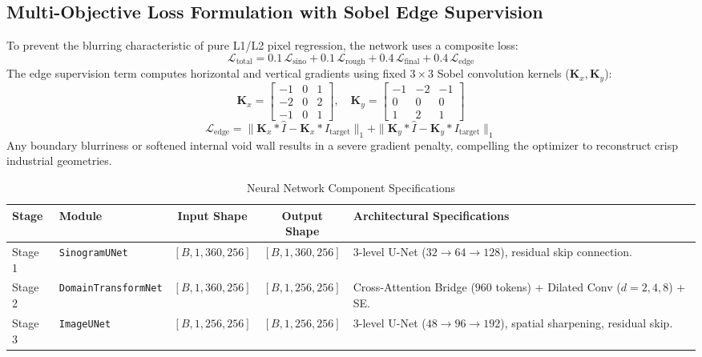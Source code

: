 \documentclass[10pt,a4paper]{article}
\begin{document}
\subsection{Multi-Objective Loss Formulation with Sobel Edge Supervision}
To prevent the blurring characteristic of pure L1/L2 pixel regression, the network uses a composite loss:
\begin{equation}
    \mathcal{L}_{\text{total}} = 0.1\,\mathcal{L}_{\text{sino}} + 0.1\,\mathcal{L}_{\text{rough}} + 0.4\,\mathcal{L}_{\text{final}} + 0.4\,\mathcal{L}_{\text{edge}}
\end{equation}
The edge supervision term computes horizontal and vertical gradients using fixed $3 \times 3$ Sobel convolution kernels ($\mathbf{K}_x, \mathbf{K}_y$):
\begin{equation}
    \mathbf{K}_x = \begin{bmatrix} -1 & 0 & 1 \\ -2 & 0 & 2 \\ -1 & 0 & 1 \end{bmatrix}, \quad
    \mathbf{K}_y = \begin{bmatrix} -1 & -2 & -1 \\ 0 & 0 & 0 \\ 1 & 2 & 1 \end{bmatrix}
\end{equation}
\begin{equation}
    \mathcal{L}_{\text{edge}} = \|\mathbf{K}_x * \hat{I} - \mathbf{K}_x * I_{\text{target}}\|_1 + \|\mathbf{K}_y * \hat{I} - \mathbf{K}_y * I_{\text{target}}\|_1
\end{equation}
Any boundary blurriness or softened internal void wall results in a severe gradient penalty, compelling the optimizer to reconstruct crisp industrial geometries.

\begin{table}[h]
\centering
\small
\caption{Neural Network Component Specifications}
\begin{tabularx}{\textwidth}{@{}llccX@{}}
\toprule
\textbf{Stage} & \textbf{Module} & \textbf{Input Shape} & \textbf{Output Shape} & \textbf{Architectural Specifications} \\ \midrule
Stage 1 & \texttt{SinogramUNet} & $[B, 1, 360, 256]$ & $[B, 1, 360, 256]$ & 3-level U-Net ($32 \to 64 \to 128$), residual skip connection. \\
Stage 2 & \texttt{DomainTransformNet} & $[B, 1, 360, 256]$ & $[B, 1, 256, 256]$ & Cross-Attention Bridge ($960$ tokens) + Dilated Conv ($d=2,4,8$) + SE. \\
Stage 3 & \texttt{ImageUNet} & $[B, 1, 256, 256]$ & $[B, 1, 256, 256]$ & 3-level U-Net ($48 \to 96 \to 192$), spatial sharpening, residual skip. \\ \bottomrule
\end{tabularx}
\end{table}
\end{document}
